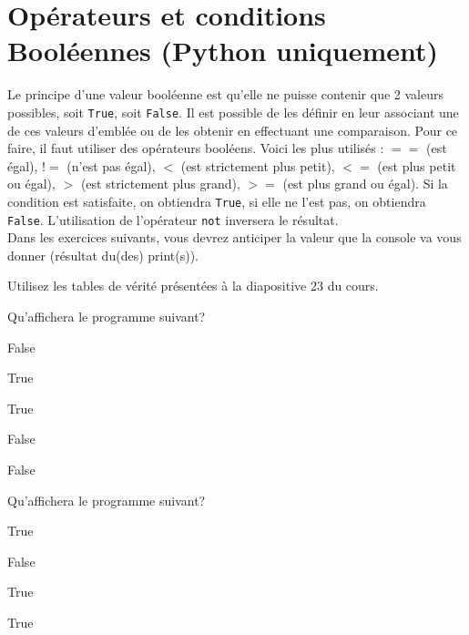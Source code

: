 \newpage
\section{Opérateurs et conditions Booléennes (Python uniquement)}
Le principe d'une valeur booléenne est qu'elle ne puisse contenir que 2 valeurs possibles, soit \lstinline{True}, soit \lstinline{False}. Il est possible de les définir en leur associant une de ces valeurs d'emblée ou de les obtenir en effectuant une comparaison. Pour ce faire, il faut utiliser des opérateurs booléens. Voici les plus utilisés : $==$ (est égal), $!=$ (n'est pas égal), $<$ (est strictement plus petit), $<=$ (est plus petit ou égal), $>$ (est strictement plus grand), $>=$ (est plus grand ou égal). Si la condition est satisfaite, on obtiendra \lstinline{True}, si elle ne l'est pas, on obtiendra \lstinline{False}. L'utilisation de l'opérateur \lstinline{not} inversera le résultat.\\

Dans les exercices suivants, vous devrez anticiper la valeur que la console va vous donner (résultat du(des) print(s)). \\

\begin{conseil}
	Utilisez les tables de vérité présentées à la diapositive 23 du cours.
\end{conseil}


\begin{Exercice}[5 minutes] Qu'affichera le programme suivant?
    
    

    \begin{solution}
        False 
        
        True 
        
        True 
        
        False 
        
        False \\
    \end{solution}
\end{Exercice}
    
\begin{Exercice}[5 minutes] Qu'affichera le programme suivant?
    
    

    \begin{solution}
        True 
        
        False 
        
        True 
        
        True \\
    \end{solution}
    
\end{Exercice}
    
